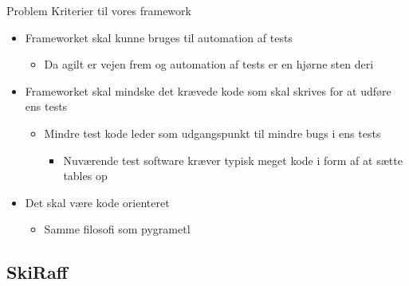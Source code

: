 \begin{frame}{Problem}{}
  Kriterier til vores framework
  \begin{itemize}
  \item<2-> Frameworket skal kunne bruges til automation af tests
    \begin{itemize}
    \item Da agilt er vejen frem og automation af tests er en hjørne sten deri
    \end{itemize}
  \item<3-> Frameworket skal mindske det krævede kode som skal skrives for at udføre ens tests
    \begin{itemize}
    \item Mindre test kode leder som udgangspunkt til mindre bugs i ens tests
      \begin{itemize}
      \item Nuværende test software kræver typisk meget kode i form af at sætte tables op
      \end{itemize}
    \end{itemize}
  \item<4-> Det skal være kode orienteret
    \begin{itemize}
    \item Samme filosofi som pygrametl
    \end{itemize}
  \end{itemize}
\end{frame}

\subsection{SkiRaff}

